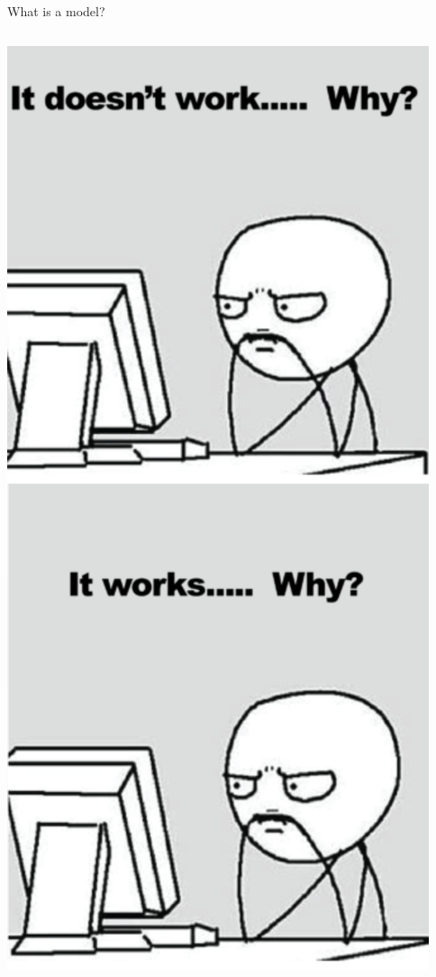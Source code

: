 \documentclass[10pt,aspectratio=169]{beamer}
\begin{document}
\begin{frame}{What is a model?}
\begin{columns}[T]
    \begin{column}{0.3\textwidth}	
      \centering \includegraphics[width=.85\textwidth]{img/model.png}
    \end{column}
  \end{columns}
  
\end{frame}
\end{document}
